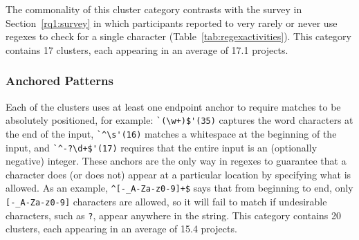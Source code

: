 The commonality of this cluster category contrasts with the survey in Section~\ref{rq1:survey} in which participants reported to very rarely or never use regexes to check for a single character (Table~\ref{tab:regexactivities}).
This category contains 17 clusters, each appearing in an average of 17.1 projects.

\subsubsection{Anchored Patterns}
Each of the clusters uses at least one endpoint anchor to require matches to be absolutely positioned, for example:
\verb!`(\w+)$'(35)! captures the word characters at the end of the input, \verb!`^\s'(16)! matches a whitespace at the beginning of the input, and \verb!`^-?\d+$'(17)! requires that the entire input is an (optionally negative) integer.
These anchors are the only way in regexes to guarantee that a character does (or does not) appear at a particular location by specifying what is allowed. As an example, \verb!^[-_A-Za-z0-9]+$! says that from beginning to end, only \verb![-_A-Za-z0-9]! characters are allowed, so it will fail to match if undesirable characters, such as \verb!?!, appear anywhere in the string.
This category contains 20 clusters, each appearing in an average of 15.4 projects.


